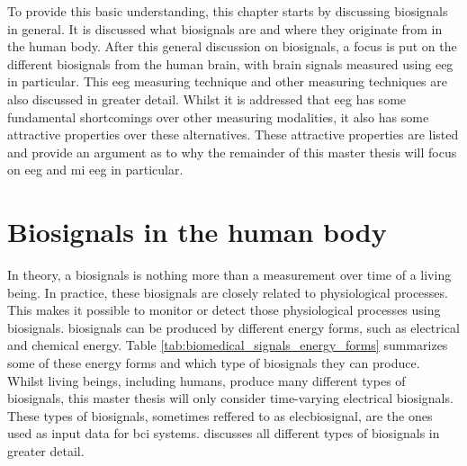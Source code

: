 To provide this basic understanding, this chapter starts by discussing \glspl{biosignal} in general.
It is discussed what \glspl{biosignal} are and where they originate from in the human body.
After this general discussion on \glspl{biosignal}, a focus is put on the different \glspl{biosignal} from the human brain, with brain signals measured using \gls{eeg} in particular.
This \gls{eeg} measuring technique and other measuring techniques are also discussed in greater detail.
Whilst it is addressed that \gls{eeg} has some fundamental shortcomings over other measuring modalities, it also has some attractive properties over these alternatives.
These attractive properties are listed and provide an argument as to why the remainder of this master thesis will focus on \gls{eeg} and \gls{mi} \gls{eeg} in particular.


\section{Biosignals in the human body}
\label{sec:biomedical_signals_biosignals_in_human}

In theory, a \glspl{biosignal} is nothing more than a measurement over time of a living
being.
In practice, these \glspl{biosignal} are closely related to physiological processes.
This makes it possible to monitor or detect those physiological processes using \glspl{biosignal}.
\Glspl{biosignal} can be produced by different energy forms, such as electrical and chemical energy.
Table \ref{tab:biomedical_signals_energy_forms} summarizes some of these energy forms and which type of \glspl{biosignal} they can produce.
Whilst living beings, including humans, produce many different types of \glspl{biosignal}, this master thesis will only consider time-varying electrical \glspl{biosignal}.
These types of \glspl{biosignal}, sometimes reffered to as \gls{elecbiosignal}, are the ones used as input data for \gls{bci} systems.
 discusses all different types of \glspl{biosignal} in greater detail.

